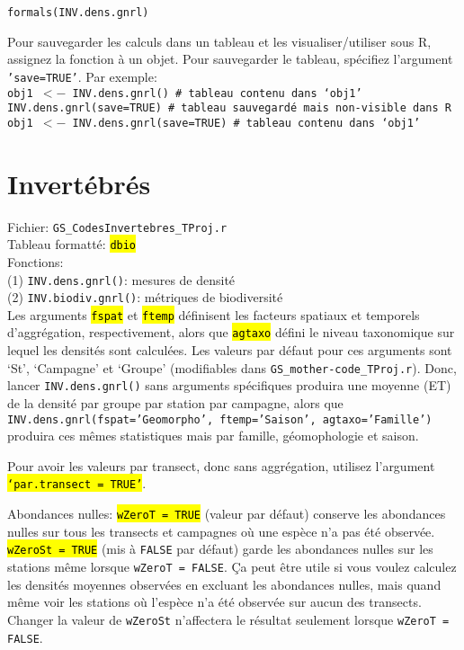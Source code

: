 \documentclass{article}
\begin{document}
\texttt{formals(INV.dens.gnrl)}


Pour sauvegarder les calculs dans un tableau et les
visualiser/utiliser sous R, assignez la fonction à
un objet. Pour sauvegarder le tableau, spécifiez l'argument
\texttt{'save=TRUE'}. Par exemple: \\

\texttt{obj1 $<-$ INV.dens.gnrl() \# tableau contenu dans `obj1'}\\
\texttt{INV.dens.gnrl(save=TRUE) \# tableau sauvegardé mais non-visible dans R}\\
\texttt{obj1 $<-$ INV.dens.gnrl(save=TRUE) \# tableau contenu dans `obj1'}\\

\section{Invertébrés}

Fichier: \texttt{GS\_CodesInvertebres\_TProj.r}\\
Tableau formatté: \hl{\texttt{dbio}}\\
Fonctions:\\
\indent (1) \texttt{INV.dens.gnrl()}:  mesures de densité\\
\indent (2) \texttt{INV.biodiv.gnrl()}:  métriques de biodiversité\\

Les arguments \hl{\texttt{fspat}} et \hl{\texttt{ftemp}} définisent les facteurs
spatiaux et temporels d'aggrégation, respectivement, alors que
\hl{\texttt{agtaxo}} défini
le niveau taxonomique sur lequel les densités sont calculées. Les
valeurs par défaut pour ces arguments sont
`St', `Campagne' et `Groupe' (modifiables dans
\texttt{GS\_mother-code\_TProj.r}). Donc,
lancer \texttt{INV.dens.gnrl()} sans arguments spécifiques produira une moyenne (ET)
de la densité par groupe par station par campagne, alors que
\texttt{INV.dens.gnrl(fspat='Geomorpho', ftemp='Saison', agtaxo='Famille')}
produira ces mêmes statistiques mais par famille, géomophologie et
saison.

Pour avoir les valeurs par transect, donc sans aggrégation, utilisez
l'argument \hl{\texttt{`par.transect = TRUE'}}.

Abondances nulles: \hl{\texttt{wZeroT = TRUE}} (valeur par défaut) conserve
les abondances nulles sur tous les transects et campagnes où une
espèce n'a pas été observée. \hl{\texttt{wZeroSt = TRUE}} (mis à
\texttt{FALSE} par défaut) garde les abondances nulles sur les
stations même lorsque \texttt{wZeroT = FALSE}. Ça peut être utile si vous
voulez calculez les densités moyennes observées en excluant les
abondances nulles, mais quand même voir les stations où l'espèce n'a
été observée sur aucun des transects. Changer la valeur de
\texttt{wZeroSt} n'affectera le résultat seulement lorsque
\texttt{wZeroT = FALSE}.
\end{document}
